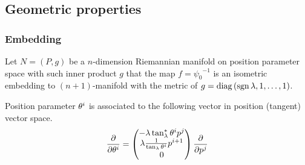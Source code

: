 \documentclass[../methodology.tex]{subfiles}
\begin{document}
\subsection{Geometric properties}
\subsubsection{Embedding}
\begin{definition}\label{M:Embedding}
  Let \(N=\left(P,g\right)\) be a \(n\)-dimension Riemannian manifold
  on position parameter space with such inner product \(g\) that
  the map \(f={\psi_0}^{-1}\)
  is an isometric embedding to \(\left(n+1\right)\)-manifold
  with the metric of \(g=\operatorname{diag}{\left(\operatorname{sgn}{\lambda},1,\dots,1\right)}\).
\end{definition}
\begin{lemma}\label{M:Tangent:Basis}
  Position parameter \(\tensor{\theta}{^i}\) is associated to the following vector in position (tangent) vector space.
  \[
    \frac{\partial}{\partial\tensor{\theta}{^i}}=
    \begin{pmatrix}
      -\lambda\tan_\lambda^\ast\tensor{\theta}{^i}\tensor{p}{^j}         \\
      \lambda\frac{1}{\tan_\lambda\tensor{\theta}{^i}}\tensor{p}{^{i+1}} \\
      0
    \end{pmatrix}\frac{\partial}{\partial\tensor{p}{^j}}
  \]
\end{lemma}
\end{document}
